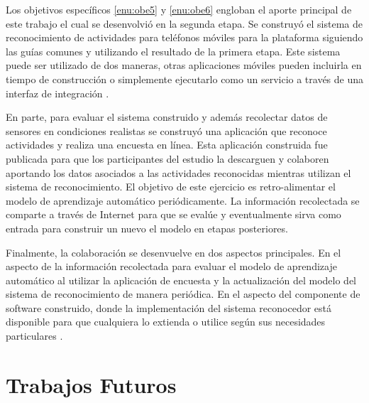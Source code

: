 Los objetivos específicos \ref{enu:obe5} y \ref{enu:obe6} engloban
el aporte principal de este trabajo el cual se desenvolvió en la segunda
etapa. Se construyó el sistema de reconocimiento de actividades para
teléfonos móviles para la plataforma \emph{} siguiendo
las guías comunes y utilizando el resultado de la primera etapa. Este
sistema puede ser utilizado de dos maneras, otras aplicaciones móviles
pueden incluirla en tiempo de construcción o simplemente ejecutarlo
como un servicio a través de una interfaz de integración \cite{GimenezYegros2016a}.

En parte, para evaluar el sistema construido y además recolectar datos
de sensores en condiciones realistas se construyó una aplicación que
reconoce actividades y realiza una encuesta en línea. Esta aplicación
\emph{} construida fue publicada para que los participantes
del estudio la descarguen y colaboren aportando los datos asociados
a las actividades reconocidas mientras utilizan el sistema de reconocimiento.
El objetivo de este ejercicio es retro-alimentar el modelo de aprendizaje
automático periódicamente. La información recolectada se comparte
a través de Internet para que se evalúe y eventualmente sirva como
entrada para construir un nuevo el modelo en etapas posteriores.

Finalmente, la colaboración se desenvuelve en dos aspectos principales.
En el aspecto de la información recolectada para evaluar el modelo
de aprendizaje automático al utilizar la aplicación de encuesta y
la actualización del modelo del sistema de reconocimiento de manera
periódica. En el aspecto del componente de software construido, donde
la implementación del sistema reconocedor está disponible para que
cualquiera lo extienda o utilice según sus necesidades particulares
\cite{GimenezYegros2016b}.

\section{Trabajos Futuros}

\label{trabajos-futuros}

